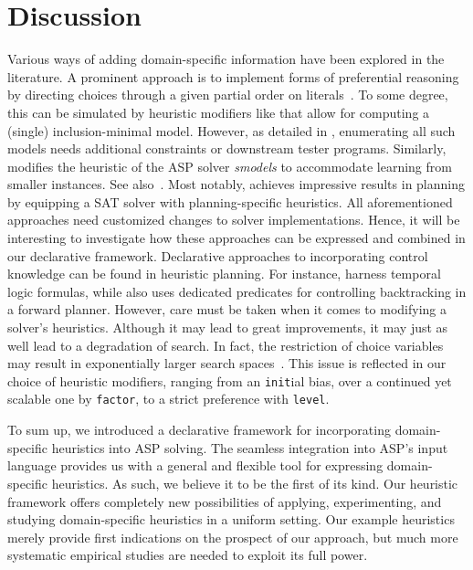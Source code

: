 
\section{Discussion}\label{sec:discussion}

Various ways of adding domain-specific information have been explored in the literature.
%
A prominent approach is to implement forms of preferential reasoning
by directing choices through
a given partial order on literals~\cite{cacacale96a,rogima10a,giumar12a}.
%
To some degree, this can be simulated by heuristic modifiers like
that allow for computing a (single) inclusion-minimal model.
However, as detailed in \cite{rogima10a}, enumerating all such models needs additional constraints
or downstream tester programs.
Similarly,
\cite{balduccini11b} modifies the heuristic of the ASP solver \textit{smodels} to accommodate learning from smaller instances.
See also~\cite{falepf01a,falemari07a}.
Most notably,
\cite{rintanen12a} achieves impressive results in planning by equipping a SAT solver with
planning-specific heuristics.
%
All aforementioned approaches need customized changes to solver implementations.
%
Hence, it will be interesting to investigate how these approaches can be expressed and combined in
our declarative framework.
%
Declarative approaches to incorporating control knowledge can be found in heuristic planning.
For instance, \cite{backab00a} harness temporal logic formulas, while \cite{sierra04a} also uses
dedicated predicates for controlling backtracking in a forward planner.
%
However,
care must be taken when it comes to modifying a solver's heuristics.
Although it may lead to great improvements, it may just as well lead to a degradation of search.
In fact, the restriction of choice variables may result in exponentially larger search spaces~\cite{jajuni05a}.
This issue is reflected in our choice of heuristic modifiers, 
ranging from an \texttt{init}ial bias,
over a continued yet scalable one by \texttt{factor},
to a strict preference with \texttt{level}.

To sum up,
we introduced a declarative framework for incorporating domain-specific heuristics into ASP solving.
The seamless integration into ASP's input language provides us with a general and flexible tool for
expressing domain-specific heuristics.
As such, we believe it to be the first of its kind.
Our heuristic framework offers completely new possibilities of applying, experimenting, and studying
domain-specific heuristics in a uniform setting.
Our example heuristics merely provide first indications on the prospect of our approach,
but much more systematic empirical studies are needed to exploit its full power.


